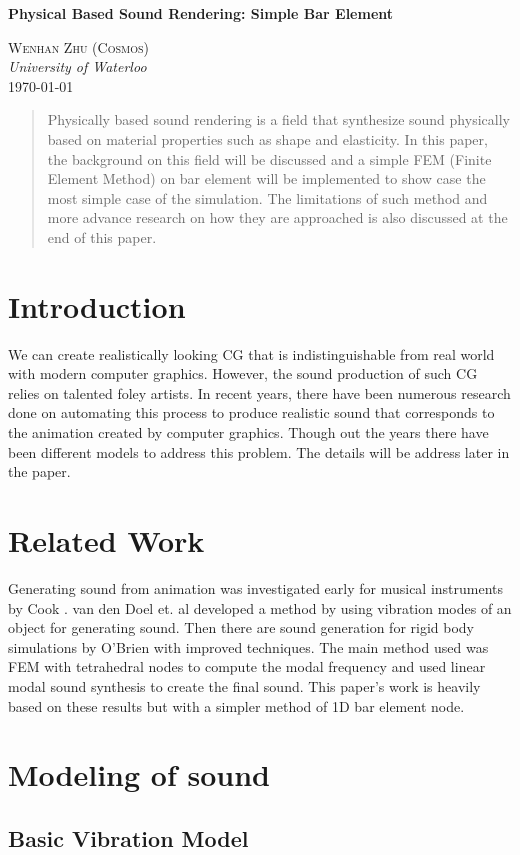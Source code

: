 \documentclass[11pt]{article}
\renewcommand{\maketitle}{
    \begin{flushright}
        {\LARGE \textbf{Physical Based Sound Rendering: Simple Bar Element}}


    {\large \textsc{Wenhan Zhu (Cosmos)} \\ \textit{University of Waterloo}}
    \\ \today

    \end{flushright}
}
\begin{document}
\maketitle

\begin{abstract}
    Physically based sound rendering is a field that synthesize sound physically based on material properties such as shape and elasticity. In this paper, the background on this field will be discussed and a simple FEM (Finite Element Method) on bar element will be implemented to show case the most simple case of the simulation. The limitations of such method and more advance research on how they are approached is also discussed at the end of this paper.
\end{abstract}

\section*{Introduction}
We can create realistically looking CG that is indistinguishable from real world with modern computer graphics. However, the sound production of such CG relies on talented foley artists. In recent years, there have been numerous research done on automating this process to produce realistic sound that corresponds to the animation created by computer graphics. Though out the years there have been different models to address this problem. The details will be address later in the paper.



\section*{Related Work}
Generating sound from animation was investigated early for musical instruments by Cook \cite{Cook7}. van den Doel et. al \cite{Doel1996} \cite{Doel1998} developed a method by using vibration modes of an object for generating sound. Then there are sound generation for rigid body simulations by O'Brien \cite{Brien2002} with improved techniques. The main method used was FEM with tetrahedral nodes to compute the modal frequency and used linear modal sound synthesis to create the final sound. This paper's work is heavily based on these results but with a simpler method of 1D bar element node.

\section*{Modeling of sound}
\subsection*{Basic Vibration Model}
\end{document}
